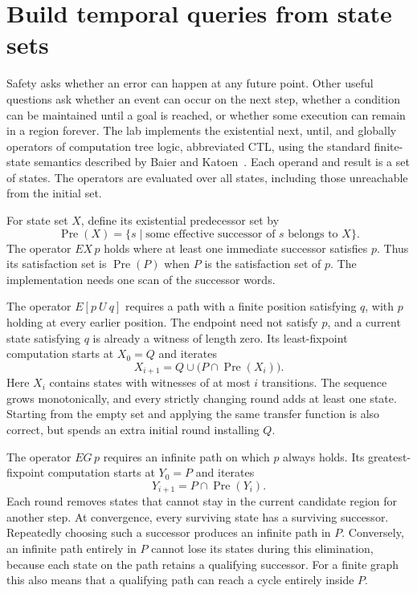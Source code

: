 \section{Build temporal queries from state sets}
\label{sec:ch48-ctl}

Safety asks whether an error can happen at any future point.
Other useful questions ask whether an event can occur on the next step, whether a condition can be maintained until a goal is reached, or whether some execution can remain in a region forever.
The lab implements the existential next, until, and globally operators of computation tree logic, abbreviated CTL, using the standard finite-state semantics described by Baier and Katoen~\cite{baier-2008-model-checking}.
Each operand and result is a set of states.
The operators are evaluated over all states, including those unreachable from the initial set.

For state set $X$, define its existential predecessor set by
\[
  \operatorname{Pre}(X)
  = \{s\mid\text{some effective successor of }s\text{ belongs to }X\}.
\]
The operator $EX\,p$ holds where at least one immediate successor satisfies $p$.
Thus its satisfaction set is $\operatorname{Pre}(P)$ when $P$ is the satisfaction set of $p$.
The implementation needs one scan of the successor words.

The operator $E[p\ U\ q]$ requires a path with a finite position satisfying $q$, with $p$ holding at every earlier position.
The endpoint need not satisfy $p$, and a current state satisfying $q$ is already a witness of length zero.
Its least-fixpoint computation starts at $X_0=Q$ and iterates
\[
  X_{i+1}=Q\cup\bigl(P\cap\operatorname{Pre}(X_i)\bigr).
\]
Here $X_i$ contains states with witnesses of at most $i$ transitions.
The sequence grows monotonically, and every strictly changing round adds at least one state.
Starting from the empty set and applying the same transfer function is also correct, but spends an extra initial round installing $Q$.

The operator $EG\,p$ requires an infinite path on which $p$ always holds.
Its greatest-fixpoint computation starts at $Y_0=P$ and iterates
\[
  Y_{i+1}=P\cap\operatorname{Pre}(Y_i).
\]
Each round removes states that cannot stay in the current candidate region for another step.
At convergence, every surviving state has a surviving successor.
Repeatedly choosing such a successor produces an infinite path in $P$.
Conversely, an infinite path entirely in $P$ cannot lose its states during this elimination, because each state on the path retains a qualifying successor.
For a finite graph this also means that a qualifying path can reach a cycle entirely inside $P$.

